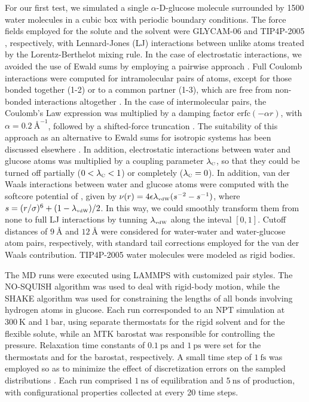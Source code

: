 \documentclass[
    journal=jctcce,
    layout=twocolumn
]{achemso}
\begin{document}
For our first test, we simulated a single \mbox{$\alpha$-D-glucose} molecule surrounded by 1500 water molecules in a cubic box with periodic boundary conditions. The force fields employed for the solute and the solvent were GLYCAM-06 \cite{Kirschner_2007} and TIP4P-2005 \cite{Abascal_2005}, respectively, with Lennard-Jones (LJ) interactions between unlike atoms treated by the Lorentz-Berthelot mixing rule. In the case of electrostatic interactions, we avoided the use of Ewald sums by employing a pairwise approach \cite{Fennell_2006}. Full Coulomb interactions were computed for intramolecular pairs of atoms, except for those bonded together (\mbox{1-2}) or to a common partner (\mbox{1-3}), which are free from non-bonded interactions altogether \cite{Kirschner_2007}. In the case of intermolecular pairs, the Coulomb's Law expression was multiplied by a damping factor $\text{erfc}(-\alpha r)$, with $\alpha = 0.2~\text{\AA}^{-1}$, followed by a shifted-force truncation \cite{Allen_1987}. The suitability of this approach as an alternative to Ewald sums for isotropic systems has been discussed elsewhere \cite{Fennell_2006}. In addition, electrostatic interactions between water and glucose atoms was multiplied by a coupling parameter $\lambda_\text{\tiny C}$, so that they could be turned off partially ($0 < \lambda_\text{\tiny C} < 1$) or completely ($\lambda_\text{\tiny C} = 0$). In addition, van der Waals interactions between water and glucose atoms were computed with the softcore potential of \citeauthor{Beutler_1994} \cite{Beutler_1994}, given by $\nu(r) = 4 \epsilon \lambda_\text{\tiny vdW} (s^{-2} - s^{-1})$, where $s = (r/\sigma)^6 + (1 - \lambda_\text{\tiny vdW})/2$. In this way, we could smoothly transform them from none to full LJ interactions by tunning $\lambda_\text{\tiny vdW}$ along the inteval $[0,1]$. Cutoff distances of $9~\text{\AA}$ and $12~\text{\AA}$ were considered for water-water and water-glucose atom pairs, respectively, with standard tail corrections employed for the van der Waals contribution. TIP4P-2005 \cite{Abascal_2005} water molecules were modeled as rigid bodies.

The MD runs were executed using LAMMPS \cite{Plimpton_1995} with customized pair styles. The NO-SQUISH algorithm \cite{Dullweber_1997, Miller_2002, Silveira_2017} was used to deal with rigid-body motion, while the SHAKE algorithm \cite{Ryckaert_1977} was used for constraining the lengths of all bonds involving hydrogen atoms in glucose. Each run corresponded to an NPT simulation at $300~\text{K}$ and $1~\text{bar}$, using separate thermostats for the rigid solvent\cite{Kamberaj_2005} and for the flexible solute\cite{Martyna_1994}, while an MTK barostat\cite{Martyna_1994} was responsible for controlling the pressure. Relaxation time constants of $0.1~\text{ps}$ and $1~\text{ps}$ were set for the thermostats and for the barostat, respectively. A small time step of $1~\text{fs}$ was employed so as to minimize the effect of discretization errors on the sampled distributions \cite{Davidchack_2012, Silveira_2017}. Each run comprised $1~\text{ns}$ of equilibration and $5~\text{ns}$ of production, with configurational properties collected at every 20 time steps.
\end{document}
